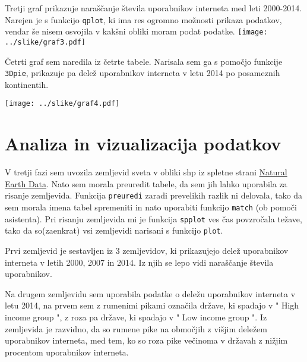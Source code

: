 \documentclass[11pt,a4paper]{article}
\begin{document}
\newpage
Tretji graf prikazuje naraščanje števila uporabnikov interneta med leti 2000-2014. Narejen je s funkcijo \verb|qplot|, ki ima res ogromno možnosti prikaza podatkov, vendar še nisem osvojila v kakšni obliki moram podat podatke. 
\-
\texttt{[image: ../slike/graf3.pdf]}

\newpage
Četrti graf sem naredila iz četrte tabele. Narisala sem ga s pomočjo funkcije \verb|3Dpie|, prikazuje pa delež uporabnikov interneta v letu 2014 po posameznih kontinentih.

\texttt{[image: ../slike/graf4.pdf]}

\newpage


\section{Analiza in vizualizacija podatkov}
V tretji fazi sem uvozila zemljevid sveta v obliki shp iz spletne strani \href{http://www.naturalearthdata.com/http//www.naturalearthdata.com/download/50m/cultural/ne_50m_admin_0_countries.zip}{Natural Earth Data}. Nato sem morala preuredit tabele, da sem jih lahko uporabila za risanje zemljevida. Funkcija \verb|preuredi| zaradi prevelikih razlik ni delovala, tako da sem morala imena tabel spremeniti in nato uporabiti funkcijo \verb|match| (ob pomoči asistenta). Pri risanju zemljevida mi je funkcija \verb|spplot| ves čas povzročala težave, tako da so(zaenkrat) vsi zemljevidi narisani s funkcijo \verb|plot|. 

Prvi zemljevid je sestavljen iz 3 zemljevidov, ki prikazujejo delež uporabnikov interneta v letih 2000, 2007 in 2014. Iz njih se lepo vidi naraščanje števila uporabnikov.

\newpage

\begin{figure}[htp] \centering{
}

\end{figure}  


\newpage

Na drugem zemljevidu sem uporabila podatke o deležu uporabnikov interneta v letu 2014, na prvem sem z rumenimi pikami označila države, ki spadajo v " High income group ", z roza pa države, ki spadajo v " Low income group ". Iz zemljevida je razvidno, da so rumene pike na območjih z višjim deležem uporabnikov interneta, med tem, ko so roza pike večinoma v državah z nižjim procentom uporabnikov interneta.


\begin{figure}[h!] 
\begin{center}
 
 \end{center}
\end{figure}
\end{document}
